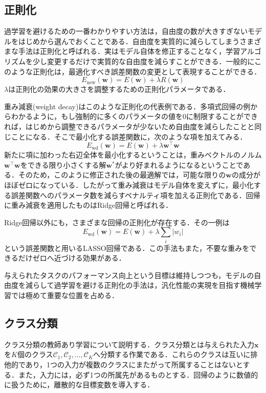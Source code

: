 \documentclass[a4paper,11pt]{jsreport}
\begin{document}
\subsection{正則化}
過学習を避けるための一番わかりやすい方法は，自由度の数が大きすぎないモデルをはじめから選んでおくことである．自由度を実質的に減らしてしまうさまざまな手法は正則化と呼ばれる．実はモデル自体を修正することなく，学習アルゴリズムを少し変更するだけで実質的な自由度を減らすことができる．一般的にこのような正則化は，最適化すべき誤差関数の変更として表現することができる．
\begin{equation}
  E_{\text{new}}(\bm{w}) 
  = E(\bm{w}) + \lambda R(\bm{w})
\end{equation}
$\lambda$は正則化の効果の大きさを調整するための正則化パラメータである．\par
重み減衰(weight decay)はこのような正則化の代表例である．多項式回帰の例からわかるように，もし強制的に多くのパラメータの値を0に制限することができれば，はじめから調整できるパラメータが少ないため自由度を減らしたことと同じことになる．そこで最小化する誤差関数に，次のような項を加えてみる．
\begin{equation}
  E_{\text{wd}}(\bm{w}) 
  = E(\bm{w}) + \lambda \bm{w}^{\top} \bm{w}
\end{equation}
新たに項に加わった右辺全体を最小化するということは，重みベクトルのノルム$\bm{w}^{\top} \bm{w}$をできる限り小さくする解$\bm{w}^*$がより好まれるようになるということである．そのため，このように修正された後の最適解では，可能な限りの$\bm{w}$の成分がほぼゼロになっている．したがって重み減衰はモデル自体を変えずに，最小化する誤差関数へのパラメータ数を減らすペナルティ項を加える正則化である．回帰に重み減衰を適用したものはRidge回帰と呼ばれる．\par
Ridge回帰以外にも，さまざまな回帰の正則化が存在する．その一例は
\begin{equation}
  E_{\text{wd}}(\bm{w}) 
  = E(\bm{w}) + \lambda \sum_i |w_i|
\end{equation}
という誤差関数と用いるLASSO回帰である．この手法もまた，不要な重みをできるだけゼロへ近づける効果がある．\par
与えられたタスクのパフォーマンス向上という目標は維持しつつも，モデルの自由度を減らして過学習を避ける正則化の手法は，汎化性能の実現を目指す機械学習では極めて重要な位置を占める．


\subsection{クラス分類}
クラス分類の教師あり学習について説明する．クラス分類とは与えられた入力$\bm{x}$を$K$個のクラス$\mathcal{C}_1, \mathcal{C}_2, \dots, \mathcal{C}_K$へ分類する作業である．これらのクラスは互いに排他的であり，1つの入力が複数のクラスにまたがって所属することはないとする．また，入力には，必ず1つの所属先があるものとする．回帰のように数値的に扱うために，離散的な目標変数を導入する．
\end{document}
